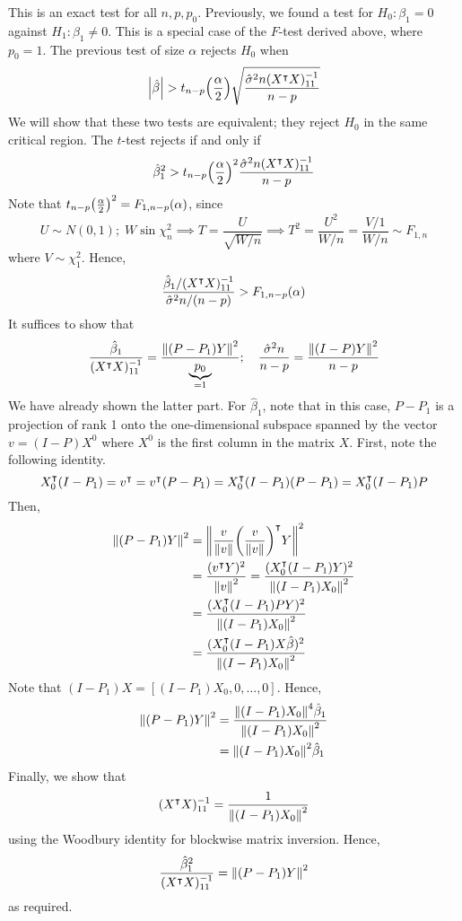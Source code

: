 This is an exact test for all \( n, p, p_0 \).
Previously, we found a test for \( H_0\colon \beta_1 = 0 \) against \( H_1 \colon \beta_1 \neq 0 \).
This is a special case of the \( F \)-test derived above, where \( p_0 = 1 \).
The previous test of size \( \alpha \) rejects \( H_0 \) when
\[ \abs{\hat\beta} > t_{n-p}\qty(\frac{\alpha}{2}) \sqrt{\frac{\hat\sigma^2 n (X^\intercal X)^{-1}_{11}}{n-p}} \]
We will show that these two tests are equivalent; they reject \( H_0 \) in the same critical region.
The \( t \)-test rejects if and only if
\[ \hat \beta_1^2 > t_{n-p}\qty(\frac{\alpha}{2})^2 \frac{\hat\sigma^2 n (X^\intercal X)^{-1}_{11}}{n-p} \]
Note that \( t_{n-p}\qty(\frac{\alpha}{2})^2 = F_{1,n-p}(\alpha) \), since
\[ U \sim N(0,1);\;W \sin \chi^2_n \implies T = \frac{U}{\sqrt{W/n}} \implies T^2 = \frac{U^2}{W/n} = \frac{V/1}{W/n} \sim F_{1,n} \]
where \( V \sim \chi^2_1 \).
Hence,
\[ \frac{\hat \beta_1/(X^\intercal X)^{-1}_{11}}{\hat\sigma^2 n/(n-p)} > F_{1,n-p}(\alpha) \]
It suffices to show that
\[ \frac{\hat \beta_1}{(X^\intercal X)^{-1}_{11}} = \frac{\norm{(P-P_1)Y}^2}{\underbrace{p_0}_{=1}};\quad \frac{\hat \sigma^2 n}{n-p} = \frac{\norm{(I-P)Y}^2}{n-p} \]
We have already shown the latter part.
For \( \hat \beta_1 \), note that in this case, \( P - P_1 \) is a projection of rank 1 onto the one-dimensional subspace spanned by the vector \( v = (I-P)X^0 \) where \( X^0 \) is the first column in the matrix \( X \).
First, note the following identity.
\[ X_0^\intercal (I - P_1) = v^\intercal = v^\intercal (P-P_1) = X_0^\intercal (I-P_1)(P-P_1) = X_0^\intercal (I-P_1)P \]
Then,
\begin{align*}
	\norm{(P-P_1)Y}^2 &= \norm{\frac{v}{\norm{v}} \qty(\frac{v}{\norm{v}})^\intercal Y}^2 \\
	&= \frac{(v^\intercal Y)^2}{\norm{v}^2} = \frac{(X_0^\intercal (I-P_1) Y)^2}{\norm{(I-P_1) X_0}^2} \\
	&= \frac{(X_0^\intercal (I-P_1) P Y)^2}{\norm{(I-P_1) X_0}^2} \\
	&= \frac{(X_0^\intercal (I-P_1) X \hat\beta)^2}{\norm{(I-P_1) X_0}^2}
\end{align*}
Note that \( (I-P_1) X = [(I-P_1)X_0, 0, \dots, 0] \).
Hence,
\begin{align*}
	\norm{(P-P_1)Y}^2 &= \frac{\norm{(I-P_1)X_0}^4 \hat \beta_1}{\norm{(I-P_1)X_0}^2} \\
	&= \norm{(I-P_1)X_0}^2 \hat \beta_1
\end{align*}
Finally, we show that
\[ (X^\intercal X)^{-1}_{11} = \frac{1}{\norm{(I-P_1)X_0}^2} \]
using the Woodbury identity for blockwise matrix inversion.
Hence,
\[ \frac{\hat\beta_1^2}{(X^\intercal X)^{-1}_{11}} = \norm{(P-P_1) Y}^2 \]
as required.

